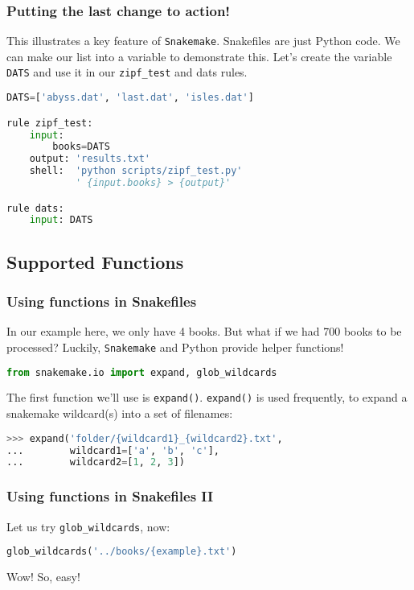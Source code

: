 \begin{frame}[fragile]
  \frametitle{Putting the last change to action!}
  This illustrates a key feature of \texttt{Snakemake}. Snakefiles are just Python code. We can make our list into a variable to demonstrate this. Let’s create the variable \texttt{DATS} and use it in our \texttt{zipf\_test} and dats rules.

  \begin{lstlisting}[language=Python,style=Python]
DATS=['abyss.dat', 'last.dat', 'isles.dat']

rule zipf_test:
    input:
        books=DATS
    output: 'results.txt'
    shell:  'python scripts/zipf_test.py'
            ' {input.books} > {output}'

rule dats:
    input: DATS
  \end{lstlisting}
\end{frame}

\subsection{Supported Functions}

\begin{frame}[fragile]
  \frametitle{Using functions in Snakefiles}
  In our example here, we only have 4 books. But what if we had 700 books to be processed? \newline
  Luckily, \texttt{Snakemake} and Python provide helper functions!
  \begin{lstlisting}[language=Python,style=Python]
from snakemake.io import expand, glob_wildcards
  \end{lstlisting}
  The first function we’ll use is \texttt{expand()}. \texttt{expand()} is used frequently, to expand a snakemake wildcard(s) into a set of filenames:
  \begin{lstlisting}[language=Python,style=Python]
>>> expand('folder/{wildcard1}_{wildcard2}.txt',
...        wildcard1=['a', 'b', 'c'],
...        wildcard2=[1, 2, 3])
  \end{lstlisting}
\end{frame}

\begin{frame}[fragile]
  \frametitle{Using functions in Snakefiles II}
  \pause
  \pause
  Let us try \texttt{glob\_wildcards}, now:
  \begin{lstlisting}[language=Python,style=Python]
glob_wildcards('../books/{example}.txt')
  \end{lstlisting}
  \pause
  Wow! So, easy!
\end{frame}

